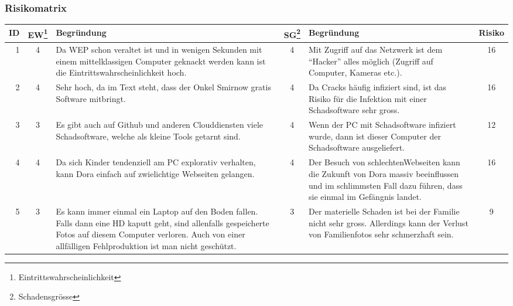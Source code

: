 \begin{landscape}

\subsubsection{Risikomatrix}
\begin{tabularx}{\columnwidth}{|r|c|X|c|X|c|}
	\hline
	\textbf{ID} & \textbf{EW\footnote{Eintrittswahrscheinlichkeit}} & \textbf{Begründung} & \textbf{SG\footnote{Schadensgrösse}} & \textbf{Begründung} & \textbf{Risiko} \\ 
	\hline		
	1 &  \cellcolor{red}4 & Da WEP schon veraltet ist und in wenigen Sekunden mit einem mittelklassigen Computer geknackt werden kann ist die Eintrittswahrscheinlichkeit hoch. & \cellcolor{red}4 & Mit Zugriff auf das Netzwerk ist dem “Hacker” alles möglich	(Zugriff auf Computer, Kameras etc.).  & \cellcolor{red}16 \\ \hline
	
	2 &  \cellcolor{red}4 & Sehr hoch, da im Text steht, dass der Onkel Smirnow gratis Software mitbringt.  & \cellcolor{red}4 & Da Cracks häufig infiziert sind, ist das Risiko für die Infektion mit einer Schadsoftware sehr gross.  & \cellcolor{red}16 \\ \hline
	
	3 &  \cellcolor{orange}3 &  Es gibt auch auf Github und anderen Clouddiensten viele Schadsoftware, welche als kleine Tools getarnt sind.  & \cellcolor{red}4 & Wenn der PC mit Schadsoftware infiziert wurde, dann ist dieser Computer der Schadsoftware ausgeliefert.  & \cellcolor{red}12 \\ \hline
	
	4 &  \cellcolor{red}4 & Da sich Kinder tendenziell am PC explorativ verhalten, kann Dora einfach auf zwielichtige Webseiten gelangen.  & \cellcolor{red}4 & Der Besuch von \grqq schlechten\grqq \space Webseiten kann die Zukunft von Dora massiv beeinflussen und im schlimmsten Fall dazu führen, dass sie einmal im Gefängnis landet. & \cellcolor{red}16 \\ \hline
	
	5 &  \cellcolor{orange}3 & Es kann immer einmal ein Laptop auf den Boden fallen. Falls dann eine HD kaputt geht, sind allenfalls gespeicherte Fotos auf diesem Computer verloren. Auch von einer allfälligen Fehlproduktion ist man nicht geschützt. & \cellcolor{orange}3 & Der materielle Schaden ist bei der Familie nicht sehr gross. Allerdings kann der Verlust von Familienfotos sehr schmerzhaft sein. & \cellcolor{orange}9 \\ \hline
	

\end{tabularx}
\end{landscape}
